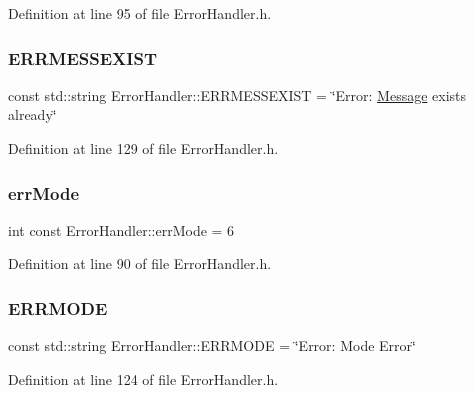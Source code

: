 Definition at line 95 of file Error\+Handler.\+h.

\mbox{\label{classErrorHandler_a8abcac399b5014dad5f8d728298489e3}} 
\subsubsection{\texorpdfstring{ERRMESSEXIST}{ERRMESSEXIST}}
{\footnotesize\ttfamily const std\+::string Error\+Handler\+::\+E\+R\+R\+M\+E\+S\+S\+E\+X\+I\+ST = \char`\"{}Error\+: \mbox{\hyperlink{classMessage}{Message}} exists already\char`\"{}\hspace{0.3cm}{\ttfamily [static]}}



Definition at line 129 of file Error\+Handler.\+h.

\mbox{\label{classErrorHandler_a1ec0cf275df16d2fe2641cc29c0f2ff0}} 
\subsubsection{\texorpdfstring{errMode}{errMode}}
{\footnotesize\ttfamily int const Error\+Handler\+::err\+Mode = 6\hspace{0.3cm}{\ttfamily [static]}}



Definition at line 90 of file Error\+Handler.\+h.

\mbox{\label{classErrorHandler_a88183b288608b1f8c54c84a27d5f6a40}} 
\subsubsection{\texorpdfstring{ERRMODE}{ERRMODE}}
{\footnotesize\ttfamily const std\+::string Error\+Handler\+::\+E\+R\+R\+M\+O\+DE = \char`\"{}Error\+: Mode Error\char`\"{}\hspace{0.3cm}{\ttfamily [static]}}



Definition at line 124 of file Error\+Handler.\+h.

\mbox{\label{classErrorHandler_aeb08094d2754a72bdaf44a80c77d4189}} 
